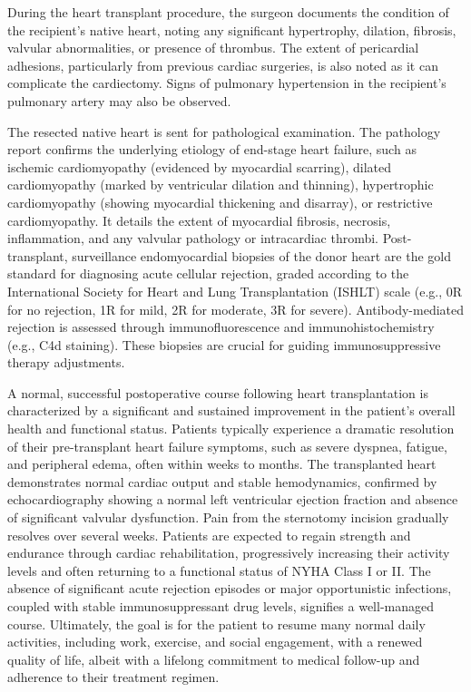 During the heart transplant procedure, the surgeon documents the condition of the recipient's native heart, noting any significant hypertrophy, dilation, fibrosis, valvular abnormalities, or presence of thrombus. The extent of pericardial adhesions, particularly from previous cardiac surgeries, is also noted as it can complicate the cardiectomy. Signs of pulmonary hypertension in the recipient's pulmonary artery may also be observed.

The resected native heart is sent for pathological examination. The pathology report confirms the underlying etiology of end-stage heart failure, such as ischemic cardiomyopathy (evidenced by myocardial scarring), dilated cardiomyopathy (marked by ventricular dilation and thinning), hypertrophic cardiomyopathy (showing myocardial thickening and disarray), or restrictive cardiomyopathy. It details the extent of myocardial fibrosis, necrosis, inflammation, and any valvular pathology or intracardiac thrombi. Post-transplant, surveillance endomyocardial biopsies of the donor heart are the gold standard for diagnosing acute cellular rejection, graded according to the International Society for Heart and Lung Transplantation (ISHLT) scale (e.g., 0R for no rejection, 1R for mild, 2R for moderate, 3R for severe). Antibody-mediated rejection is assessed through immunofluorescence and immunohistochemistry (e.g., C4d staining). These biopsies are crucial for guiding immunosuppressive therapy adjustments.

A normal, successful postoperative course following heart transplantation is characterized by a significant and sustained improvement in the patient's overall health and functional status. Patients typically experience a dramatic resolution of their pre-transplant heart failure symptoms, such as severe dyspnea, fatigue, and peripheral edema, often within weeks to months. The transplanted heart demonstrates normal cardiac output and stable hemodynamics, confirmed by echocardiography showing a normal left ventricular ejection fraction and absence of significant valvular dysfunction. Pain from the sternotomy incision gradually resolves over several weeks. Patients are expected to regain strength and endurance through cardiac rehabilitation, progressively increasing their activity levels and often returning to a functional status of NYHA Class I or II. The absence of significant acute rejection episodes or major opportunistic infections, coupled with stable immunosuppressant drug levels, signifies a well-managed course. Ultimately, the goal is for the patient to resume many normal daily activities, including work, exercise, and social engagement, with a renewed quality of life, albeit with a lifelong commitment to medical follow-up and adherence to their treatment regimen.

